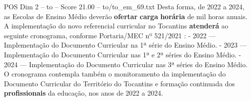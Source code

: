 \begin{textsample}{POS Dim 2 – to – Score 21.00 – to/to\_em\_69.txt}
Desta forma, de 2022 a 2024, as Escolas de Ensino Médio deverão \textbf{ofertar} \textbf{carga} \textbf{horária} de mil horas anuais.
A implementação do novo referencial curricular no Tocantins \textbf{atenderá} ao seguinte cronograma, conforme Portaria/MEC nº 521/2021 : - 2022 — Implementação do Documento Curricular na 1ª série do Ensino Médio. - 2023 — Implementação do Documento Curricular nas 1ª e 2ª séries do Ensino Médio. - 2024 — Implementação do Documento Curricular nas 3ª séries do Ensino Médio.
O cronograma contempla também o monitoramento da implementação do Documento Curricular do Território do Tocantins e formação continuada dos \textbf{profissionais} da educação, nos anos de 2022 a 2024.

\end{textsample}
